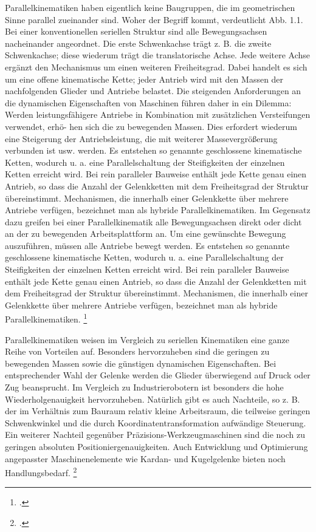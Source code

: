 Parallelkinematiken haben eigentlich keine Baugruppen, die im geometrischen Sinne parallel zueinander sind. Woher der Begriff kommt, verdeutlicht Abb. 1.1. Bei einer konventionellen seriellen Struktur sind alle Bewegungsachsen nacheinander angeordnet. Die erste Schwenkachse trägt z. B. die zweite Schwenkachse; diese wiederum trägt die translatorische Achse. Jede weitere Achse ergänzt den Mechanismus um einen weiteren Freiheitsgrad. Dabei handelt es sich um eine offene kinematische Kette; jeder Antrieb wird mit den Massen der nachfolgenden Glieder und Antriebe
belastet. Die steigenden Anforderungen an die dynamischen Eigenschaften von Maschinen führen daher in ein Dilemma: Werden leistungsfähigere Antriebe in Kombination mit zusätzlichen Versteifungen verwendet, erhö-
hen sich die zu bewegenden Massen. Dies erfordert wiederum eine Steigerung der Antriebsleistung, die mit weiterer Massevergrößerung verbunden ist usw. werden. Es entstehen so genannte geschlossene kinematische Ketten, wodurch u. a. eine Parallelschaltung der Steifigkeiten der einzelnen Ketten erreicht wird. Bei rein paralleler Bauweise enthält jede Kette genau einen Antrieb, so dass die Anzahl der Gelenkketten mit dem Freiheitsgrad der Struktur übereinstimmt. Mechanismen, die innerhalb einer Gelenkkette über mehrere Antriebe verfügen, bezeichnet man als hybride Parallelkinematiken. Im Gegensatz dazu greifen bei einer Parallelkinematik alle Bewegungsachsen direkt oder dicht an der zu bewegenden Arbeitsplattform an. Um eine gewünschte Bewegung auszuführen, müssen alle Antriebe bewegt werden. Es entstehen so genannte geschlossene kinematische Ketten, wodurch u. a. eine Parallelschaltung der Steifigkeiten der einzelnen Ketten erreicht wird. Bei rein paralleler Bauweise enthält jede Kette genau einen Antrieb, so dass die Anzahl der Gelenkketten mit dem Freiheitsgrad der Struktur übereinstimmt. Mechanismen, die innerhalb einer Gelenkkette über mehrere Antriebe verfügen, bezeichnet man als hybride Parallelkinematiken. 
\footcite[Vgl.][1-2]{Neugebauer2006}

Parallelkinematiken weisen im Vergleich zu seriellen Kinematiken eine
ganze Reihe von Vorteilen auf. Besonders hervorzuheben sind die geringen zu bewegenden Massen sowie die günstigen dynamischen Eigenschaften. Bei entsprechender Wahl der Gelenke werden die Glieder überwiegend auf Druck oder Zug beansprucht. Im Vergleich zu Industrierobotern ist besonders die hohe Wiederholgenauigkeit hervorzuheben. Natürlich gibt es auch Nachteile, so z. B. der im Verhältnis zum Bauraum relativ kleine Arbeitsraum, die teilweise geringen Schwenkwinkel und die durch Koordinatentransformation aufwändige Steuerung. Ein weiterer Nachteil gegenüber Präzisions-Werkzeugmaschinen sind die noch zu geringen absoluten Positioniergenauigkeiten. Auch Entwicklung und Optimierung angepasster Maschinenelemente wie Kardan- und Kugelgelenke bieten noch Handlungsbedarf. \footcite[Vgl.][2]{Neugebauer2006}

